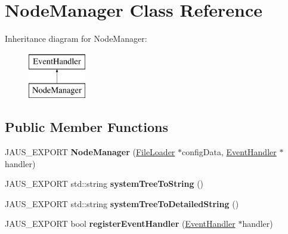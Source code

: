 \hypertarget{class_node_manager}{\section{\-Node\-Manager \-Class \-Reference}
\label{class_node_manager}
}
\-Inheritance diagram for \-Node\-Manager\-:\begin{figure}[H]
\begin{center}
\leavevmode
\includegraphics[height=2.000000cm]{class_node_manager}
\end{center}
\end{figure}
\subsection*{\-Public \-Member \-Functions}
\begin{DoxyCompactItemize}
\item 
\hypertarget{class_node_manager_ac029d6c231429b0982abdd33b7713c4d}{\-J\-A\-U\-S\-\_\-\-E\-X\-P\-O\-R\-T {\bfseries \-Node\-Manager} (\hyperlink{class_file_loader}{\-File\-Loader} $\ast$config\-Data, \hyperlink{class_event_handler}{\-Event\-Handler} $\ast$handler)}\label{class_node_manager_ac029d6c231429b0982abdd33b7713c4d}

\item 
\hypertarget{class_node_manager_aea0c74a06b296a278fc6c44bc032298b}{\-J\-A\-U\-S\-\_\-\-E\-X\-P\-O\-R\-T std\-::string {\bfseries system\-Tree\-To\-String} ()}\label{class_node_manager_aea0c74a06b296a278fc6c44bc032298b}

\item 
\hypertarget{class_node_manager_a6b57a70a475a0d01fc97a28adf2d7d03}{\-J\-A\-U\-S\-\_\-\-E\-X\-P\-O\-R\-T std\-::string {\bfseries system\-Tree\-To\-Detailed\-String} ()}\label{class_node_manager_a6b57a70a475a0d01fc97a28adf2d7d03}

\item 
\hypertarget{class_node_manager_adb09fb7b7827a916c17e7f9f1323a649}{\-J\-A\-U\-S\-\_\-\-E\-X\-P\-O\-R\-T bool {\bfseries register\-Event\-Handler} (\hyperlink{class_event_handler}{\-Event\-Handler} $\ast$handler)}\label{class_node_manager_adb09fb7b7827a916c17e7f9f1323a649}

\end{DoxyCompactItemize}
